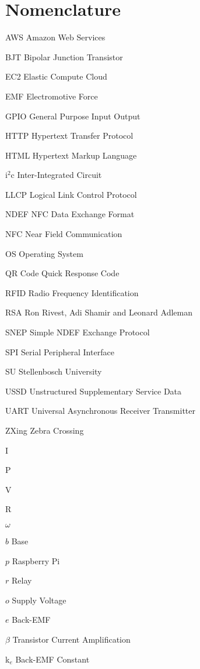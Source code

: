 \chapter{Nomenclature}

\begin{Nomencl}
   \item[AWS]\dotfill Amazon Web Services
   \item[BJT]\dotfill Bipolar Junction Transistor
   \item[EC2]\dotfill Elastic Compute Cloud
   \item[EMF]\dotfill Electromotive Force
   \item[GPIO]\dotfill General Purpose Input Output
   \item[HTTP]\dotfill Hypertext Transfer Protocol
   \item[HTML]\dotfill Hypertext Markup Language
   \item[i$^2$c]\dotfill Inter-Integrated Circuit
   \item[LLCP]\dotfill Logical Link Control Protocol
   \item[NDEF]\dotfill NFC Data Exchange Format
   \item[NFC]\dotfill Near Field Communication
   \item[OS]\dotfill Operating System
   \item[QR Code]\dotfill Quick Response Code
   \item[RFID]\dotfill Radio Frequency Identification
   \item[RSA]\dotfill Ron Rivest, Adi Shamir and Leonard Adleman
   \item[SNEP]\dotfill Simple NDEF Exchange Protocol
   \item[SPI]\dotfill Serial Peripheral Interface
   \item[SU]\dotfill Stellenbosch University
   \item[USSD]\dotfill Unstructured Supplementary Service Data
   \item[UART]\dotfill Universal Asynchronous Receiver Transmitter
   \item[ZXing]\dotfill Zebra Crossing
   \item[I]
   \item[P]
   \item[V]
   \item[R]
   \item[$\omega$]
   \item[$b$]\dotfill Base
   \item[$p$]\dotfill Raspberry Pi
   \item[$r$]\dotfill Relay				%
   \item[$o$]\dotfill Supply Voltage
   \item[$e$]\dotfill Back-EMF
   \item[$\beta$]\dotfill Transistor Current Amplification  
   \item[k$_e$]\dotfill Back-EMF Constant
\end{Nomencl}

\endinput
